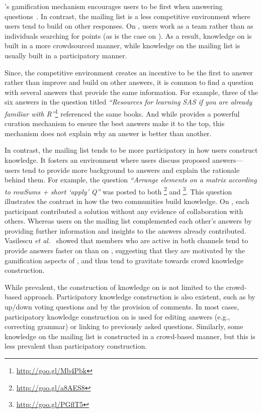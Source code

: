 \SO's gamification mechanism encourages users to be first when answering questions~\cite{Singer2013}. In contrast, the \RH mailing list is a less competitive
environment where users tend to build on other responses. On \RH, users work as a team rather than as individuals searching for points (as is the case on \SO).
As a result, knowledge on \SO is built in a more crowdsourced manner, while knowledge on the \RH mailing list is usually built in a participatory manner.

Since, the competitive \SO environment creates an incentive to be the first to answer rather than improve and build on other answers, it is common to find a question with several answers that provide the same information. For example, three of the six answers in the \SO question titled \textit{``Resources for learning SAS if you are already familiar with R''}\footnote{\url{http://goo.gl/Mb4Pbk}} referenced the same books.
And while \SO provides a powerful curation mechanism to ensure the best answers make it to the top, this mechanism does not explain why an answer is better than another.

In contrast, the \RH mailing list tends to be more participatory in how users construct knowledge. It fosters an environment where users discuss proposed answers---users tend to provide more background to answers and explain the rationale behind them.
%
For example, the question \textit{``Arrange elements on a matrix according to rowSums + short `apply' Q''} was posted to both \SO\footnote{\url{http://goo.gl/a8AES8}} and {\RH}\footnote{\url{http://goo.gl/PGflT5}}. This question illustrates the contrast in how the two communities build knowledge.
On \SO, each participant contributed a solution without any evidence of collaboration with others.
Whereas users on the \RH mailing list complemented each other's answers by providing further information and insights to the answers already
contributed. Vasilescu \textit{et al.}~\cite{Vasilescu2014c} showed that members who are active in both channels tend to provide answers faster on \SO than on \RH,
suggesting that they are motivated by the gamification aspects of \SO, and thus tend to gravitate towards crowd knowledge construction.

    
While prevalent, the construction of knowledge on \SO is not limited to the crowd-based approach. Participatory knowledge construction is also existent, such as by up/down voting questions and by the provision of comments. In most cases, participatory knowledge construction on \SO is used for editing answers (e.g., correcting grammar) or linking to previously asked questions.
Similarly, some knowledge on the \RH mailing list is constructed in a crowd-based manner, but this is less prevalent than participatory construction.

